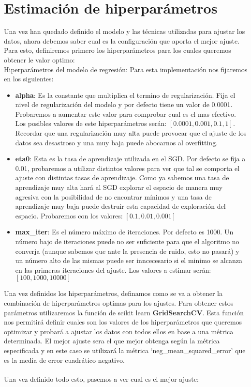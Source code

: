 \section{Estimación de hiperparámetros}
Una vez han quedado definido el modelo y las técnicas utilizadas para ajustar los datos, ahora debemos saber cual es la configuración que aporta el mejor ajuste. Para esto, definiremos primero los hiperparámetros para los cuales queremos obtener le valor optimo:
\\
Hiperparámetros del modelo de regresión: Para esta implementación nos fijaremos en los siguientes\cite{SGDRegressor}:
   \begin{itemize}
      \item \textbf{alpha}: Es la constante que multiplica el termino de regularización. Fija el nivel de regularización del modelo y por defecto tiene un valor de 0.0001. Probaremos a aumentar este valor para comprobar cual es el mas efectivo. Los posibles valores de este hiperparámetros serán: $[0.0001, 0.001, 0.1, 1]$. Recordar que una regularización muy alta puede provocar que el ajuste de los datos sea desastroso y una muy baja puede abocarnos al overfitting.
      \item \textbf{eta0}: Esta es la tasa de aprendizaje utilizada en el SGD. Por defecto se fija a 0.01, probaremos a utilizar distintos valores para ver que tal se comporta el ajuste con distintas tasas de aprendizaje. Como ya sabemos una tasa de aprendizaje muy alta hará al SGD explorar el espacio de manera muy agresiva con la posibilidad de no encontrar mínimos y una tasa de aprendizaje muy baja puede destruir esta capacidad de exploración del espacio. Probaremos con los valores: $[0.1, 0.01, 0.001]$
      \item \textbf{max\_iter}: Es el número máximo de iteraciones. Por defecto es 1000. Un número bajo de iteraciones puede no ser suficiente para que el algoritmo no converja (aunque sabemos que ante la presencia de ruido, esto no pasará) y un número alto de las mismas puede ser inncecesario si el minimo se alcanza en las primeras iteraciones del ajuste. Los valores a estimar serán: $[100, 1000, 10000]$
   \end{itemize}

Una vez definidos los hiperparámetros, definamos como se va a obtener la combinación de hiperparámetros optimas para los ajustes. Para obtener estos parámetros utilizaremos la función de scikit learn \textbf{GridSearchCV}\cite{GridSearchCV}. Esta función nos permitirá definir cuales son los valores de los hiperparámetros que queremos optimizar y probará a ajustar los datos con todos ellos en base a una métrica determinada. El mejor ajuste sera el que mejor obtenga según la métrica especificada y en este caso se utilizará la métrica `neg\_mean\_squared\_error'\cite{MSE} que es la media de error cuadrático negativo.
\\\\
Una vez definido todo esto, pasemos a ver cual es el mejor ajuste:

